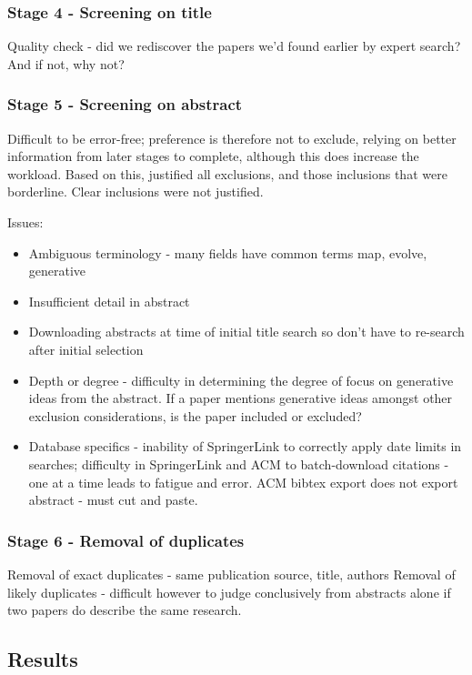 \subsubsection{Stage 4 - Screening on title}

Quality check - did we rediscover the papers we'd found earlier by expert search? And if not, why not?

\subsubsection{Stage 5 - Screening on abstract}
Difficult to be error-free; preference is therefore not to exclude, relying on better information from later stages to complete, although this does increase the workload.
Based on this, justified all exclusions, and those inclusions that were borderline. Clear inclusions were not justified.

Issues:
\begin{itemize}
	\item Ambiguous terminology - many fields have common terms \eg map, evolve, generative
	\item Insufficient detail in abstract
	\item Downloading abstracts at time of initial title search so don't have to re-search after initial selection
	\item Depth or degree - difficulty in determining the degree of focus on generative ideas from the abstract. If a paper mentions generative ideas amongst other exclusion considerations, is the paper included or excluded?
	\item Database specifics - inability of SpringerLink to correctly apply date limits in searches; difficulty in SpringerLink and ACM to batch-download citations - one at a time leads to fatigue and error. ACM bibtex export does not export abstract - must cut and paste. 
\end{itemize}

\subsubsection{Stage 6 - Removal of duplicates}

Removal of exact duplicates - same publication source, title, authors
Removal of likely duplicates - difficult however to judge conclusively from abstracts alone if two papers do describe the same research.

\subsection{Results}


